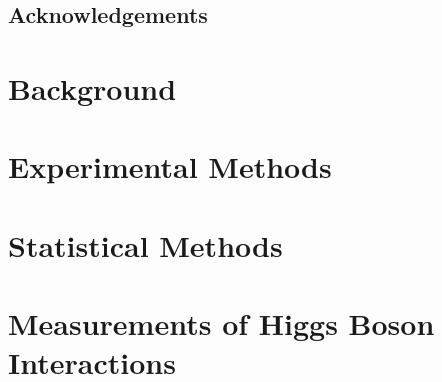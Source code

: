 \chapter*{Acknowledgements}

\clearpage

\mainmatter

\renewcommand{\chaptermark}[1]{\markboth{\MakeUppercase{\hfill \chaptername\ \thechapter.\ #1}}{}}


\part{Background}
\renewcommand{\chaptermark}[1]{\markboth{\MakeUppercase{\partname\ \thepart\ \hfill \chaptername\ \thechapter.\ #1}}{}}




\part{Experimental Methods}






\part{Statistical Methods}




\part{Measurements of Higgs Boson Interactions}


